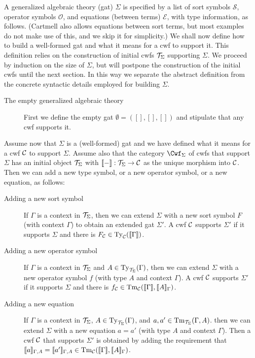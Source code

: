 \documentclass{lmcs}
\def\Sort{\mathcal{S}}
\def\Op{\mathcal{O}}
\def\Eq{\mathcal{E}}
\begin{document}
A generalized algebraic theory (gat) $\Sigma$  is specified by a list of sort symbols $\Sort$, operator symbols $\Op$, and equations (between terms) $\Eq$, with type information, as follows. (Cartmell also allows equations between sort terms, but most examples do not make use of this, and we skip it for simplicity.) We shall now define how to build a well-formed gat and what it means for a cwf to support it. This definition relies on the construction of initial cwfs ${\mathcal T}_\Sigma$ supporting $\Sigma$. We proceed by induction on the size of $\Sigma$, but will postpone the construction of the initial cwfs until the next section. In this way we separate the abstract definition from the concrete syntactic details employed for building $\Sigma$.
\begin{description}
\item[The empty generalized algebraic theory] First we define the empty gat $\emptyset = ([],[],[])$ and stipulate that any cwf supports it. 
\end{description}
Assume now that $\Sigma$ is a (well-formed) gat and we have defined what it means for a cwf ${\mathcal C}$ to support $\Sigma$. Assume also that the category $\Cwf_\Sigma$ of cwfs that support $\Sigma$ has an initial object ${\mathcal T}_\Sigma$ with $\llbracket - \rrbracket : {\mathcal T}_\Sigma \to {\mathcal C}$ as the unique morphism into ${\mathcal C}$. Then we can add a new type symbol, or a new operator symbol, or a new equation, as follows:
\begin{description}
\item[Adding a new sort symbol] 
If $\Gamma$ is a context in ${\mathcal T}_\Sigma$, then we can extend $\Sigma$ with a new sort symbol $F$ (with context $\Gamma$) to obtain an extended gat $\Sigma'$. A cwf ${\mathcal C}$ supports $\Sigma'$ if it supports $\Sigma$ and there is $F_{\mathcal C} \in \mathrm{Ty}_{\mathcal C}(\llbracket \Gamma \rrbracket)$.
\item[Adding a new operator symbol] 
If $\Gamma$ is a context in ${\mathcal T}_\Sigma$ and $A \in \mathrm{Ty}_{{\mathcal T}_\Sigma}(\Gamma)$, then we can extend $\Sigma$ with a new operator symbol $f$ (with type $A$ and context $\Gamma$). A cwf ${\mathcal C}$ supports $\Sigma'$ if it supports $\Sigma$ and there is $f_{\mathcal C} \in\mathrm{Tm}_{\mathcal C}(\llbracket \Gamma \rrbracket,\llbracket A \rrbracket_{\Gamma})$.
\item[Adding a new equation] 
If $\Gamma$ is a context in ${\mathcal T}_\Sigma$, $A \in \mathrm{Ty}_{{\mathcal T}_\Sigma}(\Gamma)$, and $a, a' \in \mathrm{Tm}_{{\mathcal T}_\Sigma}(\Gamma,A)$. then we can extend $\Sigma$ with a new equation $a = a'$ (with type $A$ and context $\Gamma$). Then a cwf ${\mathcal C}$ that supports $\Sigma'$ is obtained by adding the requirement that $\llbracket a \rrbracket_{\Gamma,A}= \llbracket a' \rrbracket_{\Gamma,A} \in \mathrm{Tm}_{\mathcal C}(\llbracket \Gamma \rrbracket,\llbracket A \rrbracket_\Gamma)$.
\end{description}
\end{document}
